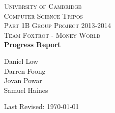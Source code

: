 \begin{titlepage}
\begin{center}

\textsc{\LARGE University of Cambridge}\\[3.5cm]

\textsc{\Large Computer Science Tripos \\[2mm] Part 1B Group Project 2013-2014}\\[0.4cm]
\textsc{\Large Team Foxtrot - Money World}\\[2cm]

{\huge \bfseries \vspace{3.5mm} Progress Report}\\[2cm]

\begin{center}
\large
Daniel Low\\
Darren Foong\\
Jovan Powar\\
Samuel Haines\\
\end{center}

\vfill

{\large Last Revised: \today}
\end{center}
\end{titlepage}
